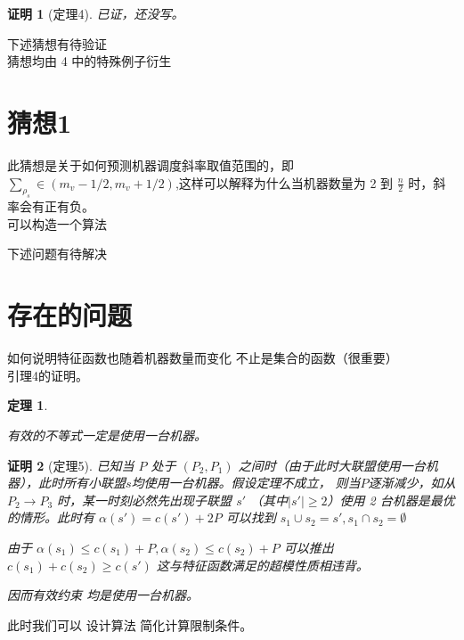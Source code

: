 \documentclass[UTF8]{article}
\newtheorem{thm}{\hspace{2em}定理}
\newtheorem{pf}{\hspace{2em}证明}
\begin{document}
\begin{pf}[定理4]

已证，还没写。
\end{pf}


下述猜想有待验证   \\
猜想均由 4 中的特殊例子衍生
\section*{猜想1}
此猜想是关于如何预测机器调度斜率取值范围的，即
$\sum_{\rho_s} \in (m_v-1/2,m_v+1/2)$,这样可以解释为什么当机器数量为 2 到 $\frac{n}{2}$ 时，斜率会有正有负。\\

可以构造一个算法

下述问题有待解决
\section{存在的问题}
如何说明特征函数也随着机器数量而变化   不止是集合的函数（很重要）   \\


引理4的证明。

\begin{thm}\label{thm5}

有效的不等式一定是使用一台机器。

\end{thm}

\begin{pf}[定理5]

已知当 $P$ 处于 $(P_2,P_1)$ 之间时（由于此时大联盟使用一台机器），此时所有小联盟$ s$均使用一台机器。假设定理不成立，
则当$P$逐渐减少，如从$ P_2 \to P_3$ 时，某一时刻必然先出现子联盟 $s'$ （其中$|s'| \geq 2 $）使用 2 台机器是最优的情形。此时有
$ \alpha(s') = c(s') +2P $  可以找到 $ s_1 \cup s_2 = s',s_1 \cap s_2 = \emptyset $

由于 $\alpha(s_1) \leq c(s_1) + P , \alpha(s_2) \leq c(s_2) + P $
可以推出 $ c(s_1) + c(s_2) \geq c(s') $  这与特征函数满足的超模性质相违背。

因而有效约束 均是使用一台机器。

\end{pf}

此时我们可以 设计算法 简化计算限制条件。
\end{document}
